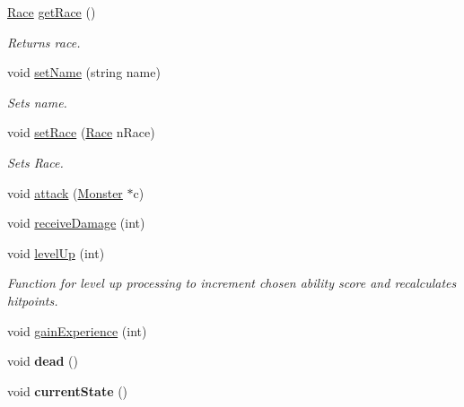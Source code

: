 \begin{DoxyCompactItemize}
\hypertarget{class_fighter_a2a733caf375a8d2e1c514418267e5017}{}\label{class_fighter_a2a733caf375a8d2e1c514418267e5017} 
\hyperlink{_entity_8h_aa2df4028f474807638d438104900b003}{Race} \hyperlink{class_fighter_a2a733caf375a8d2e1c514418267e5017}{get\+Race} ()
\begin{DoxyCompactList}\small\item\em Returns race. \end{DoxyCompactList}\item 
void \hyperlink{class_fighter_af692d6c9b24f902c13bb8b7f3350631e}{set\+Name} (string name)
\begin{DoxyCompactList}\small\item\em Sets name. \end{DoxyCompactList}\item 
void \hyperlink{class_fighter_abd0aa443cda40a70c7df3bf1949a9e79}{set\+Race} (\hyperlink{_entity_8h_aa2df4028f474807638d438104900b003}{Race} n\+Race)
\begin{DoxyCompactList}\small\item\em Sets Race. \end{DoxyCompactList}\item 
void \hyperlink{class_fighter_ac1a886e2f60333e38e90fff2a0f6107b}{attack} (\hyperlink{class_monster}{Monster} $\ast$c)
\item 
void \hyperlink{class_fighter_afe019dbd9ed0f0d10e047127dc478a63}{receive\+Damage} (int)
\item 
\hypertarget{class_fighter_a886a5fe6b7579951e64e68b76482b29c}{}\label{class_fighter_a886a5fe6b7579951e64e68b76482b29c} 
void \hyperlink{class_fighter_a886a5fe6b7579951e64e68b76482b29c}{level\+Up} (int)
\begin{DoxyCompactList}\small\item\em Function for level up processing to increment chosen ability score and recalculates hitpoints. \end{DoxyCompactList}\item 
void \hyperlink{class_fighter_af411947929c37ef0a0eab87b0c45f4f3}{gain\+Experience} (int)
\item 
\hypertarget{class_fighter_af690e4afec50a9c446120db47b463d84}{}\label{class_fighter_af690e4afec50a9c446120db47b463d84} 
void {\bfseries dead} ()
\item 
\hypertarget{class_fighter_ae888de59ae299553890387c58d774bda}{}\label{class_fighter_ae888de59ae299553890387c58d774bda} 
void {\bfseries current\+State} ()
\item 
\hypertarget{class_fighter_a60976eb2c11504befe0aff8522339636}{}\label{class_fighter_a60976eb2c11504befe0aff8522339636} 

\end{DoxyCompactItemize}
